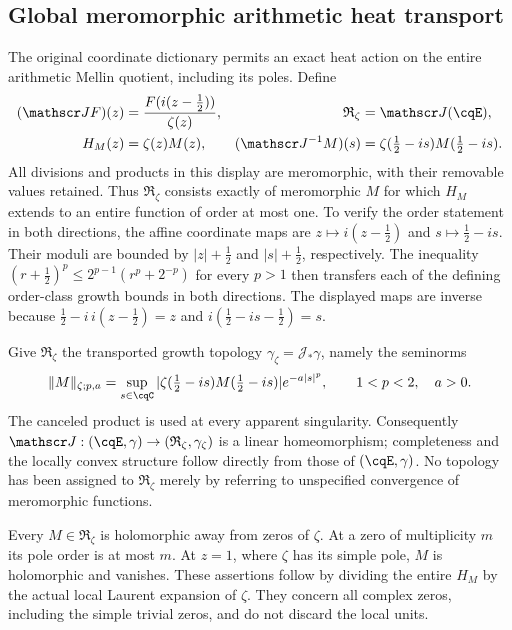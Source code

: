 \subsection{Global meromorphic arithmetic heat transport}
\label{sec:cq-meromorphic-arithmetic-heat}
The original coordinate dictionary permits an exact heat action on
the entire arithmetic Mellin quotient, including its poles. Define
\begin{equation}\label{eq:cq-meromorphic-J}
 \begin{aligned}
 (\mathscr JF)(z)&=\frac{F(i(z-\tfrac12))}{\zeta(z)},
 &\mathfrak R_\zeta&=\mathscr J(\cqE),\\
 H_M(z)&=\zeta(z)M(z),
 &(\mathscr J^{-1}M)(s)&=
       \zeta(\tfrac12-is)M(\tfrac12-is).
 \end{aligned}
\end{equation}
All divisions and products in this display are meromorphic, with
their removable values retained. Thus $\mathfrak R_\zeta$ consists
exactly of meromorphic $M$ for which $H_M$ extends to an entire
function of order at most one. To verify the order statement in
both directions, the affine coordinate maps are
$z\mapsto i(z-\tfrac12)$ and $s\mapsto\tfrac12-is$.
Their moduli are bounded by $|z|+\tfrac12$ and
$|s|+\tfrac12$, respectively. The inequality
$(r+\tfrac12)^p\leq2^{p-1}(r^p+2^{-p})$ for every $p>1$
then transfers each of the defining order-class growth bounds
in both directions. The displayed maps are inverse because
$\tfrac12-i\,i(z-\tfrac12)=z$ and
$i(\tfrac12-is-\tfrac12)=s$.

Give $\mathfrak R_\zeta$ the transported growth topology
$\gamma_\zeta=\mathscr J_*\gamma$, namely the seminorms
\begin{equation}\label{eq:cq-meromorphic-seminorms}
 \|M\|_{\zeta;p,a}
 =\sup_{s\in\cqC}
   |\zeta(\tfrac12-is)M(\tfrac12-is)|e^{-a|s|^p},
 \qquad 1<p<2,\quad a>0.
\end{equation}
The canceled product is used at every apparent singularity.
Consequently $\mathscr J:(\cqE,\gamma)\to
(\mathfrak R_\zeta,\gamma_\zeta)$ is a linear homeomorphism;
completeness and the locally convex structure follow directly
from those of $(\cqE,\gamma)$. No topology has been assigned
to $\mathfrak R_\zeta$ merely by referring to unspecified
convergence of meromorphic functions.

Every $M\in\mathfrak R_\zeta$ is holomorphic away from zeros
of $\zeta$. At a zero of multiplicity $m$ its pole order is at
most $m$. At $z=1$, where $\zeta$ has its simple pole, $M$
is holomorphic and vanishes. These assertions follow by dividing
the entire $H_M$ by the actual local Laurent expansion of
$\zeta$. They concern all complex zeros, including the simple
trivial zeros, and do not discard the local units.

